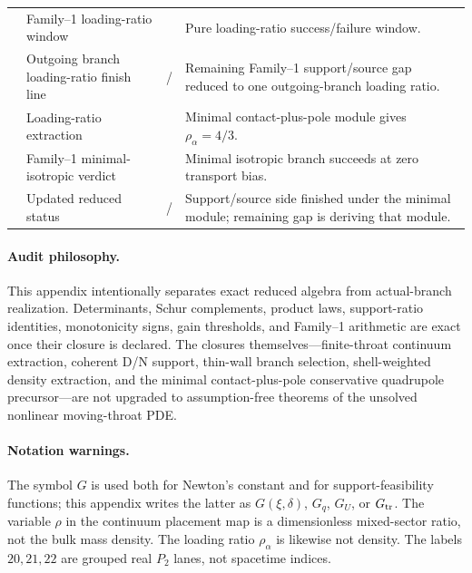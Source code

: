 \begin{longtable}{@{}L{0.09\textwidth}L{0.30\textwidth}L{0.20\textwidth}L{0.35\textwidth}@{}}
 & Family--1 loading-ratio window & \StatusExactClosure{} & Pure loading-ratio success/failure window. \\
 & Outgoing branch loading-ratio finish line & \StatusExactClosure{} / \StatusOpen{} & Remaining Family--1 support/source gap reduced to one outgoing-branch loading ratio. \\
 & Loading-ratio extraction & \StatusExactClosure{} & Minimal contact-plus-pole module gives \(\rho_\alpha=4/3\). \\
 & Family--1 minimal-isotropic verdict & \StatusExactClosure{} & Minimal isotropic branch succeeds at zero transport bias. \\
 & Updated reduced status & \StatusExactClosure{} / \StatusOpen{} & Support/source side finished under the minimal module; remaining gap is deriving that module. \\
\bottomrule
\end{longtable}

\paragraph{Audit philosophy.}
This appendix intentionally separates exact reduced algebra from actual-branch realization.  Determinants, Schur complements, product laws, support-ratio identities, monotonicity signs, gain thresholds, and Family--1 arithmetic are exact once their closure is declared.  The closures themselves---finite-throat continuum extraction, coherent D/N support, thin-wall branch selection, shell-weighted density extraction, and the minimal contact-plus-pole conservative quadrupole precursor---are not upgraded to assumption-free theorems of the unsolved nonlinear moving-throat PDE.

\paragraph{Notation warnings.}
The symbol \(G\) is used both for Newton's constant and for support-feasibility functions; this appendix writes the latter as \(G(\xi,\delta)\), \(G_q\), \(G_U\), or \(G_{\rm tr}\).  The variable \(\rho\) in the continuum placement map is a dimensionless mixed-sector ratio, not the bulk mass density.  The loading ratio \(\rho_\alpha\) is likewise not density.  The labels \(20,21,22\) are grouped real \(P_2\) lanes, not spacetime indices.

